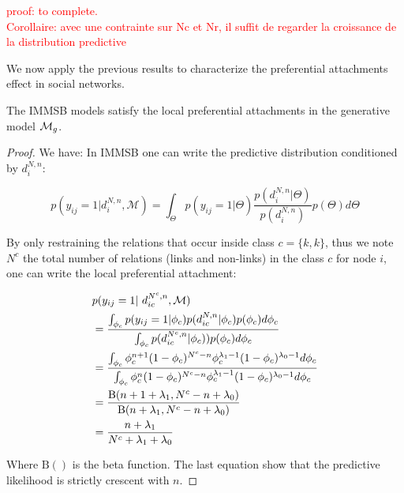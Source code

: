 \textcolor{red}{proof: to complete. \\
	Corollaire: avec une contrainte sur Nc et Nr, il suffit de regarder la croissance de la distribution predictive}





We now apply the previous results to characterize the preferential attachments effect in social networks.


\begin{proposition}
	The IMMSB models satisfy the local preferential attachments in the generative model $\mathcal{M}_g$.
\end{proposition}

\begin{proof}
We have:
In IMMSB one can write the predictive distribution conditioned by $d_i^{N,n}$:

\begin{equation} 
p(y_{ij} = 1 | d_i^{N,n}, \mathcal{M}) = \int_{\Theta} p(y_{ij}=1|\Theta) \frac{p(d_i^{N,n} | \Theta)}{p(d_i^{N,n})} p(\Theta) d\Theta \nonumber
\end{equation}

By only restraining the relations that occur inside class $c=\{k,k\}$, thus we note $N^c$ the total number of relations (links and non-links) in the class $c$ for node $i$, one can write the local preferential attachment:

\begin{align*} \label{eq:sum}
&p(y_{ij} = 1 | d_{ic}^{N^c,n}, \mathcal{M})  \\
&=  \frac{ \int_{\phi_{c}} p(y_{ij}=1|\phi_{c}) p(d_{ic}^{N,n} | \phi_{c}) p(\phi_{c}) d\phi_{c}}{\int_{\phi_{c}} \p(d_{ic}^{N^c,n} | \phi_{c}))       p(\phi_{c}) d\phi_{c}}   \\
&= \frac{\int_{\phi_c} \phi_c^{n+1}(1-\phi_c)^{N^c-n} \phi_c^{\lambda_1-1} (1-\phi_c)^{\lambda_0-1} d\phi_{c}}{\int_{\phi_c} \phi_c^{n}(1-\phi_c)^{N^c-n} \phi_c^{\lambda_1-1} (1-\phi_c)^{\lambda_0-1} d\phi_{c}} \\
&= \frac{ \text{B}(n+1+\lambda_1, N^c-n+\lambda_0) }{\text{B}(n+\lambda_1, N^c-n+\lambda_0)} \\
&= \frac{n+\lambda_1}{N^c + \lambda_1 +\lambda_0}
\end{align*}

Where $\text{B}()$ is the beta function. The last equation show that the predictive likelihood is strictly crescent with $n$.


\end{proof}

